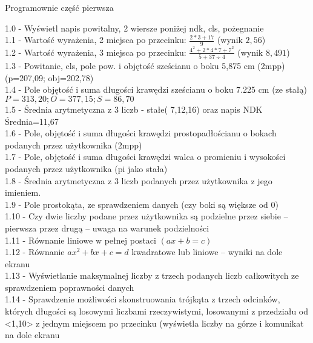 \documentclass[a4paper,11pt]{article}
\begin{document}
\begin{center}
\large{Programownie część pierwsza}\\

\begin{itemize}[ label={}]
    \normalsize{\item{
    {1.0 - Wyświetl napis powitalny, 2 wiersze poniżej ndk, cls, pożegnanie}{} \\
    {1.1 - Wartość wyrażenia, 2 miejsca po przecinku: $\frac{2*3+17}{9}$ (wynik $2,56$) }{}\\
    {1.2 - Wartość wyrażenia, 3 miejsca po przecinku: $\frac{4^2+2*4*7+7^2}{5+37\div4}$ (wynik $8,491$) }{} \\
    {1.3 - Powitanie, cls, pole pow. i objętość sześcianu o boku 5,875 cm (2mpp) (p=207,09; obj=202,78) \\
    {1.4 - Pole objętość i suma długości krawędzi sześcianu o boku 7.225 cm (ze stałą)
$P=313,20; O=377,15; S=86,70$}{} \\
    {1.5 - Średnia arytmetyczna z 3 liczb - stałe( 7,12,16) oraz napis NDK
Średnia=11,67}{} \\
    {1.6 - Pole, objętość i suma długości krawędzi prostopadłościanu o bokach podanych
przez użytkownika (2mpp) }{} \\
    {1.7 - Pole, objętość i suma długości krawędzi walca o promieniu i wysokości podanych
przez użytkownika (pi jako stała)}{} \\
    {1.8 - Średnia arytmetyczna z 3 liczb podanych przez użytkownika z jego imieniem.}{} \\
    {1.9 - Pole prostokąta, ze sprawdzeniem danych (czy boki są większe od 0)}{} \\
    {1.10 - Czy dwie liczby podane przez użytkownika są podzielne przez siebie – pierwsza
przez drugą – uwaga na warunek podzielności}{} \\
    {1.11 - Równanie liniowe w pełnej postaci $(ax+b=c)$}{}\\
    {1.12 - Równanie $ax^2+bx+c=d$ kwadratowe lub liniowe – wyniki na dole ekranu}{}\\
    {1.13 - Wyświetlanie maksymalnej liczby z trzech podanych liczb całkowitych ze sprawdzeniem poprawności danych}{}\\
    {1.14 - Sprawdzenie możliwości skonstruowania trójkąta z trzech odcinków, których długości są losowymi liczbami rzeczywistymi, losowanymi z przedziału od <1,10> z jednym miejscem po przecinku (wyświetla liczby na górze i komunikat na dole ekranu}{}\\
}}}
\end{itemize}

\end{center}
\end{document}
